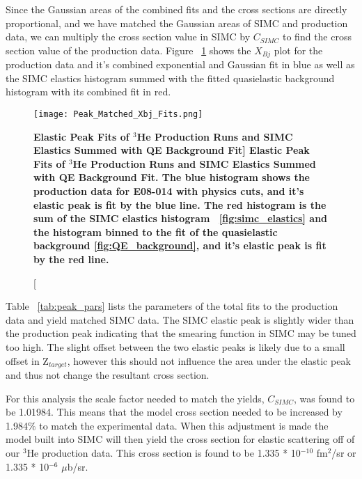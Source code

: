Since the Gaussian areas of the combined fits and the cross sections are directly proportional, and we have matched the Gaussian areas of SIMC and production data, we can multiply the cross section value in SIMC by $C_{SIMC}$ to find the cross section value of the production data. Figure ~\ref{fig:final_xs} shows the $X_{Bj}$ plot for the production data and it's combined exponential and Gaussian fit in blue as well as the SIMC elastics histogram summed with the fitted quasielastic background histogram with its combined fit in red. 

\begin{figure}[!ht]
\begin{center}
\texttt{[image: Peak\_Matched\_Xbj\_Fits.png]}
\end{center}
\caption[\bf{Elastic Peak Fits of $^{3}$He Production Runs and SIMC Elastics Summed with QE Background Fit}]{
{\bf{Elastic Peak Fits of $^{3}$He Production Runs and SIMC Elastics Summed with QE Background Fit.}} The blue histogram shows the production data for E08-014 with physics cuts, and it's elastic peak is fit by the blue line. The red histogram is the sum of the SIMC elastics histogram ~\ref{fig:simc_elastics} and the histogram binned to the fit of the quasielastic background \ref{fig:QE_background}, and it's elastic peak is fit by the red line.}
\label{fig:final_xs}
\end{figure}

Table ~\ref{tab:peak_pars} lists the parameters of the total fits to the production data and yield matched SIMC data. The SIMC elastic peak is slightly wider than the production peak indicating that the smearing function in SIMC may be tuned too high. The slight offset between the two elastic peaks is likely due to a small offset in Z$_{target}$, however this should not influence the area under the elastic peak and thus not change the resultant cross section. 

For this analysis the scale factor needed to match the yields, $C_{SIMC}$, was found to be 1.01984. This means that the model cross section needed to be increased by 1.984$\%$ to match the experimental data. When this adjustment is made the model built into SIMC will then yield the cross section for elastic scattering off of our $^3$He production data. This cross section is found to be 1.335 * 10$^{-10}$ fm$^2$/sr or 1.335 * 10$^{-6}$ $\mu$b/sr.

\vspace{5mm}

